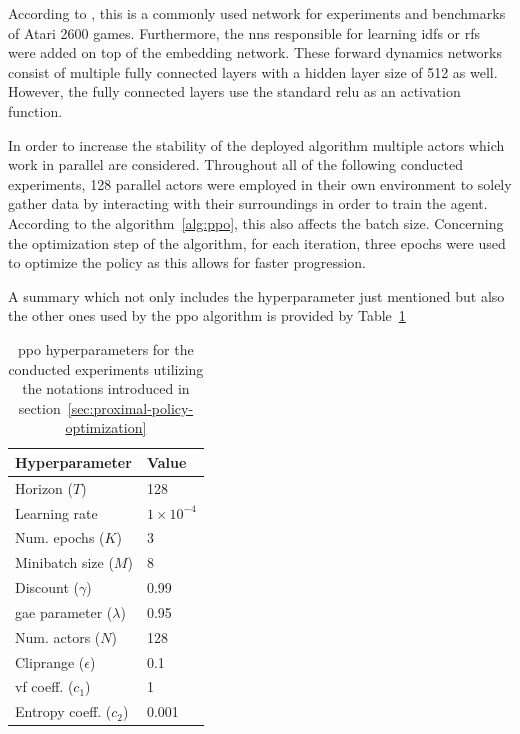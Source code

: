 \documentclass[draft,final]{vutinfth} %
\begin{document}
    According to \citet{burda_large-scale_2018-1}, this is a commonly used network for experiments and benchmarks of Atari 2600 games.
    Furthermore, the \glspl{nn} responsible for learning \glspl{idf} or \glspl{rf}  were added on top of the embedding network.
    These forward dynamics networks consist of multiple fully connected layers with a hidden layer size of 512 as well.
    However, the fully connected layers use the standard \gls{relu} as an activation function.

    In order to increase the stability of the deployed algorithm multiple actors which work in parallel are considered.
    Throughout all of the following conducted experiments, 128 parallel actors were employed in their own environment to solely gather data by interacting with their surroundings in order to train the agent.
    According to the algorithm~\ref{alg:ppo}, this also affects the batch size.
    Concerning the optimization step of the algorithm, for each iteration, three epochs were used to optimize the policy as this allows for faster progression.

    A summary which not only includes the hyperparameter just mentioned but also the other ones used by the \gls{ppo} algorithm is provided by Table~\ref{tab:ppo_params}

    \begin{table}[h]
        \centering
        \begin{tabular}{|l|l|}
            \hline
            Hyperparameter                       & Value              \\
            \hline
            Horizon ($T$)                        & 128                \\
            Learning rate                        & $1 \times 10^{-4}$ \\
            Num. epochs  ($K$)                     & 3                  \\
            Minibatch size ($M$)                 & 8                  \\
            Discount ($\gamma$)                  & 0.99               \\
            \acrshort{gae} parameter ($\lambda$) & 0.95               \\
            Num. actors ($N$)                    & 128                \\
            Cliprange ($\epsilon$)               & 0.1                \\
            \acrshort{vf} coeff. ($c_1$)         & 1                  \\
            Entropy coeff. ($c_2$)               & 0.001              \\
            \hline
        \end{tabular}
        \caption[\acrlong{ppo} hyperparameters for the conducted experiments]{\gls{ppo} hyperparameters for the conducted experiments utilizing the notations introduced in section~\ref{sec:proximal-policy-optimization}}
        \label{tab:ppo_params}
    \end{table}
\end{document}
